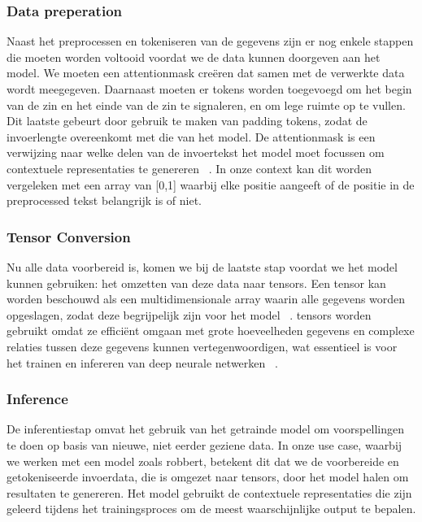 \subsubsection{Data preperation}

Naast het preprocessen en tokeniseren van de gegevens zijn er nog enkele stappen die moeten worden voltooid voordat we de data kunnen doorgeven aan het model. We moeten een \gls{attentionmask} creëren dat samen met de verwerkte data wordt meegegeven. Daarnaast moeten er tokens worden toegevoegd om het begin van de zin en het einde van de zin te signaleren, en om lege ruimte op te vullen. Dit laatste gebeurt door gebruik te maken van padding tokens, zodat de invoerlengte overeenkomt met die van het model. De \gls{attentionmask} is een verwijzing naar welke delen van de invoertekst het model moet focussen om contextuele representaties te genereren ~\autocite{Clark2019}. In onze context kan dit worden vergeleken met een array van [0,1] waarbij elke positie aangeeft of de positie in de preprocessed tekst belangrijk is of niet.

\subsubsection{Tensor Conversion}

Nu alle data voorbereid is, komen we bij de laatste stap voordat we het model kunnen gebruiken: het omzetten van deze data naar \glspl{tensor}. Een \gls{tensor} kan worden beschouwd als een multidimensionale array waarin alle gegevens worden opgeslagen, zodat deze begrijpelijk zijn voor het model ~\autocite{Kolda2009}. \Glspl{tensor} worden gebruikt omdat ze efficiënt omgaan met grote hoeveelheden gegevens en complexe relaties tussen deze gegevens kunnen vertegenwoordigen, wat essentieel is voor het trainen en infereren van deep neurale netwerken ~\autocite{Panagakis2021}.

\subsubsection{Inference}

De inferentiestap omvat het gebruik van het getrainde model om voorspellingen te doen op basis van nieuwe, niet eerder geziene data. In onze use case, waarbij we werken met een model zoals \gls{robbert}, betekent dit dat we de voorbereide en getokeniseerde invoerdata, die is omgezet naar \glspl{tensor}, door het model halen om resultaten te genereren. Het model gebruikt de contextuele representaties die zijn geleerd tijdens het trainingsproces om de meest waarschijnlijke output te bepalen.

